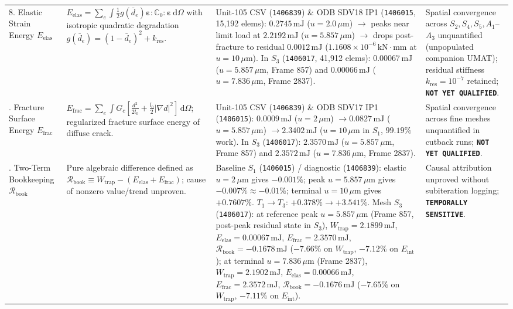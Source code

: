 \begin{table}[htbp]
\begin{tabularx}{\textwidth}{p{2.2cm}p{3.8cm}p{4.2cm}X}
8. Elastic Strain Energy $E_{\mathrm{elas}}$ & $E_{\mathrm{elas}} = \sum_e \int \frac{1}{2} g(\bar{d}_e) \boldsymbol{\varepsilon} : \mathbb{C}_0 : \boldsymbol{\varepsilon}\,\mathrm{d}\Omega$ with isotropic quadratic degradation $g(\bar{d}_e) = (1-\bar{d}_e)^2 + k_{\mathrm{res}}$. & Unit-105 CSV (\texttt{1406839}) \& ODB SDV18 IP1 (\texttt{1406015}, 15,192 elems): $0.2745\,\mathrm{mJ}$ ($u=2.0\,\mu\mathrm{m}$) $\to$ peaks near limit load at $2.2192\,\mathrm{mJ}$ ($u=5.857\,\mu\mathrm{m}$) $\to$ drops post-fracture to residual $0.0012\,\mathrm{mJ}$ ($1.1608\times 10^{-6}\,\mathrm{kN\cdot mm}$ at $u=10\,\mu\mathrm{m}$). In $S_3$ (\texttt{1406017}, 41,912 elems): $0.00067\,\mathrm{mJ}$ ($u=5.857\,\mu\mathrm{m}$, Frame 857) and $0.00066\,\mathrm{mJ}$ ($u=7.836\,\mu\mathrm{m}$, Frame 2837). & Spatial convergence across $S_2, S_4, S_5, A_1$--$A_3$ unquantified (unpopulated companion UMAT); residual stiffness $k_{\mathrm{res}}=10^{-7}$ retained; \textbf{\texttt{NOT YET QUALIFIED}}. \\
\addlinespace
9. Fracture Surface Energy $E_{\mathrm{frac}}$ & $E_{\mathrm{frac}} = \sum_e \int G_c [\frac{d^2}{2l_0} + \frac{l_0}{2}|\nabla d|^2]\,\mathrm{d}\Omega$; regularized fracture surface energy of diffuse crack. & Unit-105 CSV (\texttt{1406839}) \& ODB SDV17 IP1 (\texttt{1406015}): $0.0009\,\mathrm{mJ}$ ($u=2\,\mu\mathrm{m}$) $\to 0.0827\,\mathrm{mJ}$ ($u=5.857\,\mu\mathrm{m}$) $\to 2.3402\,\mathrm{mJ}$ ($u=10\,\mu\mathrm{m}$ in $S_1$, $99.19\%$ work). In $S_3$ (\texttt{1406017}): $2.3570\,\mathrm{mJ}$ ($u=5.857\,\mu\mathrm{m}$, Frame 857) and $2.3572\,\mathrm{mJ}$ ($u=7.836\,\mu\mathrm{m}$, Frame 2837). & Spatial convergence across fine meshes unquantified in cutback runs; \textbf{\texttt{NOT YET QUALIFIED}}. \\
\addlinespace
10. Two-Term Bookkeeping $\mathcal{R}_{\mathrm{book}}$ & Pure algebraic difference defined as $\mathcal{R}_{\mathrm{book}} \equiv W_{\mathrm{trap}} - (E_{\mathrm{elas}} + E_{\mathrm{frac}})$; cause of nonzero value/trend unproven. & Baseline $S_1$ (\texttt{1406015}) / diagnostic (\texttt{1406839}): elastic $u=2\,\mu\mathrm{m}$ gives $-0.001\%$; peak $u=5.857\,\mu\mathrm{m}$ gives $-0.007\% \approx -0.01\%$; terminal $u=10\,\mu\mathrm{m}$ gives $+0.7607\%$. $T_1 \to T_3$: $+0.378\% \to +3.541\%$. Mesh $S_3$ (\texttt{1406017}): at reference peak $u=5.857\,\mu\mathrm{m}$ (Frame 857, post-peak residual state in $S_3$), $W_{\mathrm{trap}} = 2.1899\,\mathrm{mJ}$, $E_{\mathrm{elas}} = 0.00067\,\mathrm{mJ}$, $E_{\mathrm{frac}} = 2.3570\,\mathrm{mJ}$, $\mathcal{R}_{\mathrm{book}} = -0.1678\,\mathrm{mJ}$ ($-7.66\%$ on $W_{\mathrm{trap}}$, $-7.12\%$ on $E_{\mathrm{int}}$); at terminal $u=7.836\,\mu\mathrm{m}$ (Frame 2837), $W_{\mathrm{trap}} = 2.1902\,\mathrm{mJ}$, $E_{\mathrm{elas}} = 0.00066\,\mathrm{mJ}$, $E_{\mathrm{frac}} = 2.3572\,\mathrm{mJ}$, $\mathcal{R}_{\mathrm{book}} = -0.1676\,\mathrm{mJ}$ ($-7.65\%$ on $W_{\mathrm{trap}}$, $-7.11\%$ on $E_{\mathrm{int}}$). & Causal attribution unproved without subiteration logging; \textbf{\texttt{TEMPORALLY SENSITIVE}}. \\

\end{tabularx}
\end{table}
